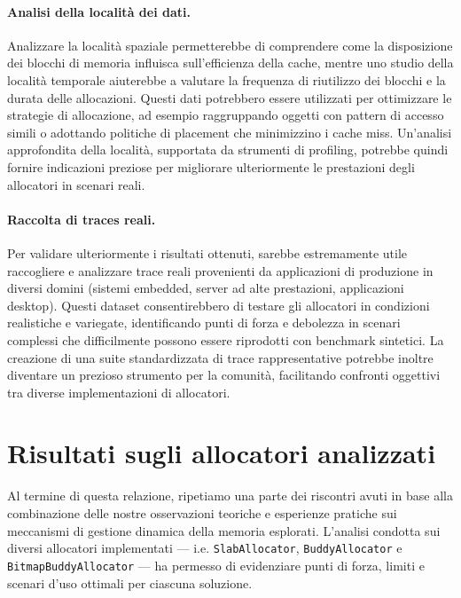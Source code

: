 \paragraph{Analisi della località dei dati.}
Analizzare la località spaziale permetterebbe di comprendere come la disposizione dei blocchi di memoria influisca sull'efficienza della cache, mentre uno studio della località temporale aiuterebbe a valutare la frequenza di riutilizzo dei blocchi e la durata delle allocazioni. Questi dati potrebbero essere utilizzati per ottimizzare le strategie di allocazione, ad esempio raggruppando oggetti con pattern di accesso simili o adottando politiche di placement che minimizzino i cache miss. Un'analisi approfondita della località, supportata da strumenti di profiling, potrebbe quindi fornire indicazioni preziose per migliorare ulteriormente le prestazioni degli allocatori in scenari reali.

\paragraph{Raccolta di traces reali.}
Per validare ulteriormente i risultati ottenuti, sarebbe estremamente utile raccogliere e analizzare trace reali provenienti da applicazioni di produzione in diversi domini (sistemi embedded, server ad alte prestazioni, applicazioni desktop). Questi dataset consentirebbero di testare gli allocatori in condizioni realistiche e variegate, identificando punti di forza e debolezza in scenari complessi che difficilmente possono essere riprodotti con benchmark sintetici. La creazione di una suite standardizzata di trace rappresentative potrebbe inoltre diventare un prezioso strumento per la comunità, facilitando confronti oggettivi tra diverse implementazioni di allocatori. 

\section{Risultati sugli allocatori analizzati}

Al termine di questa relazione, ripetiamo una parte dei riscontri avuti in base alla combinazione delle nostre osservazioni teoriche e esperienze pratiche sui meccanismi di gestione dinamica della memoria esplorati. L’analisi condotta sui diversi allocatori implementati — i.e. \texttt{SlabAllocator}, \texttt{BuddyAllocator} e \texttt{BitmapBuddyAllocator} — ha permesso di evidenziare punti di forza, limiti e scenari d’uso ottimali per ciascuna soluzione. 

